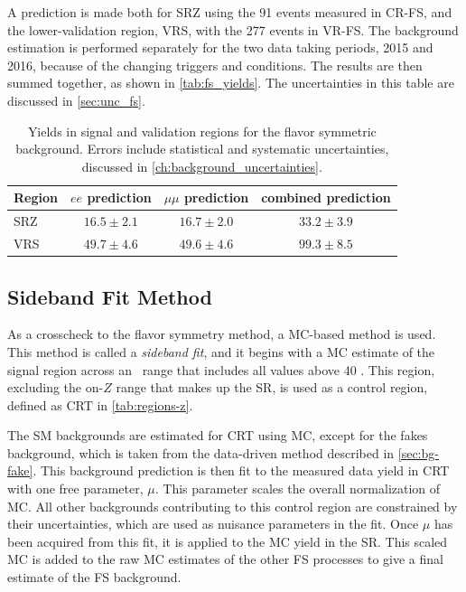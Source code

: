 A prediction is made both for SRZ using the 91 events measured in CR-FS, and the lower-\met validation region, VRS, with the 277 events in VR-FS. The background estimation is performed separately for the two data taking periods, 2015 and 2016, because of the changing triggers and conditions. The results are then summed together, as shown in \autoref{tab:fs_yields}. The uncertainties in this table are discussed in \autoref{sec:unc_fs}.

\begin{table}
\begin{center}
 \begin{tabular}{lccc}
   \hline 
   Region & $ee$ prediction & $\mu\mu$ prediction & combined prediction \\
   \hline
   \hline
SRZ & $ 16.5 \pm 2.1 $ & $ 16.7 \pm 2.0 $ & $ 33.2 \pm 3.9 $ \\
VRS & $ 49.7 \pm 4.6 $ & $ 49.6 \pm 4.6 $ & $ 99.3 \pm 8.5 $ \\
\hline
\hline
 \end{tabular}
\end{center}
 \caption{
   Yields in signal and validation regions for the flavor symmetric background. Errors include statistical and systematic uncertainties, discussed in \autoref{ch:background_uncertainties}. }
 \label{tab:fs_yields}
\end{table}

\subsection{Sideband Fit Method}
\label{sec:method-sideband}

As a crosscheck to the flavor symmetry method, a \ac{MC}-based method is used. This method is called a \textit{sideband fit}, and it begins with a \ac{MC} estimate of the signal region across an \mll~range that includes all values above 40 \gev. This region, excluding the on-$Z$ range that makes up the \ac{SR}, is used as a control region, defined as CRT in \autoref{tab:regions-z}. 

The \ac{SM} backgrounds are estimated for CRT using \ac{MC}, except for the fakes background, which is taken from the data-driven method described in \autoref{sec:bg-fake}. This background prediction is then fit to the measured data yield in CRT with one free parameter, $\mu$. This parameter scales the overall normalization of \ttbar \ac{MC}. All other backgrounds contributing to this control region are constrained by their uncertainties, which are used as nuisance parameters in the fit. Once $\mu$ has been acquired from this fit, it is applied to the \ttbar \ac{MC} yield in the \ac{SR}. This scaled \ttbar \ac{MC} is added to the raw \ac{MC} estimates of the other \ac{FS} processes to give a final estimate of the \ac{FS} background. 

